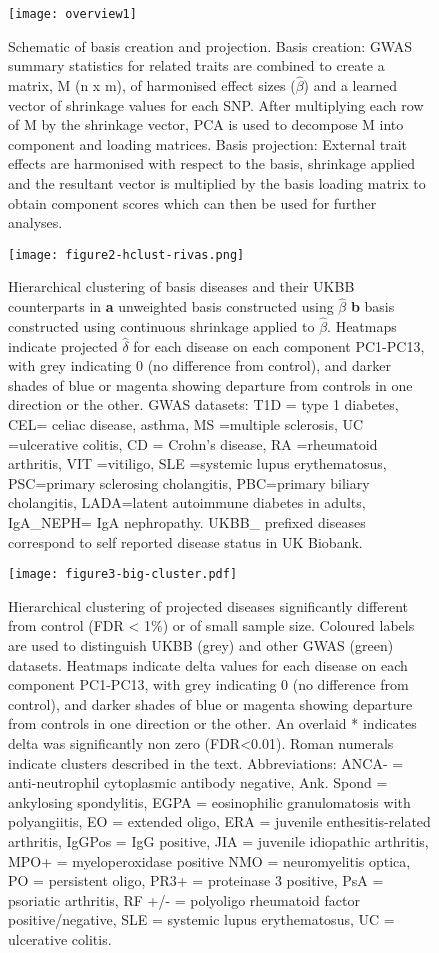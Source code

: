 \documentclass[11pt]{article}
\begin{document}
\setcounter{page}{21}
\begin{figure}
  \centering
  \texttt{[image: overview1]}
  \caption{Schematic of basis creation and projection. Basis creation: GWAS summary statistics for related traits are combined to create a matrix, M (n x m), of harmonised effect sizes ($\hat\beta$) and a learned vector of shrinkage values for each SNP. After multiplying each row of M by the shrinkage vector, PCA is used to decompose M into  component and loading matrices. Basis projection: External trait effects are harmonised with respect to the basis, shrinkage applied and the resultant vector is multiplied by the basis loading matrix to obtain component scores which can then be used for further analyses.}
  \label{fig:1}
\end{figure}


\begin{figure}
  \centering
  \texttt{[image: figure2-hclust-rivas.png]}
  \caption{Hierarchical clustering of basis diseases and their UKBB counterparts in \textbf{a} unweighted basis constructed using $\hat\beta$  \textbf{b}  basis constructed using continuous shrinkage applied to $\hat\beta$.  Heatmaps indicate projected $\hat\delta$ for each disease on each component PC1-PC13, with grey indicating 0 (no difference from control), and darker shades of blue or magenta showing departure from controls in one direction or the other. GWAS datasets: T1D = type 1 diabetes, CEL= celiac disease, asthma, MS =multiple sclerosis, UC =ulcerative colitis, CD = Crohn's disease, RA =rheumatoid arthritis, VIT =vitiligo, SLE =systemic lupus erythematosus, PSC=primary sclerosing cholangitis, PBC=primary biliary cholangitis, LADA=latent autoimmune diabetes in adults, IgA\_NEPH= IgA nephropathy. UKBB\_ prefixed diseases correspond to self reported disease status in UK Biobank.}
  \label{fig:2}
\end{figure}

\begin{figure}
  \centering
  \texttt{[image: figure3-big-cluster.pdf]}
  \caption{Hierarchical clustering of projected diseases significantly different from control (FDR < 1\%) or of small sample size. Coloured labels are used to distinguish UKBB (grey) and other GWAS (green) datasets. Heatmaps indicate delta values for each disease on each component PC1-PC13, with grey indicating 0 (no difference from control), and darker shades of blue or magenta showing departure from controls in one direction or the other. An overlaid * indicates delta was significantly non zero (FDR<0.01). Roman numerals indicate clusters described in the text. Abbreviations: ANCA- = anti-neutrophil cytoplasmic antibody negative, Ank. Spond = ankylosing spondylitis, EGPA = eosinophilic granulomatosis with polyangiitis, EO = extended oligo, ERA = juvenile enthesitis-related arthritis, IgGPos = IgG positive, JIA = juvenile idiopathic arthritis, MPO+ = myeloperoxidase positive NMO = neuromyelitis optica, PO = persistent oligo, PR3+ = proteinase 3 positive, PsA = psoriatic arthritis, RF +/- = polyoligo rheumatoid factor positive/negative, SLE = systemic lupus erythematosus, UC = ulcerative colitis.}
  \label{fig:3}
\end{figure}
\end{document}
